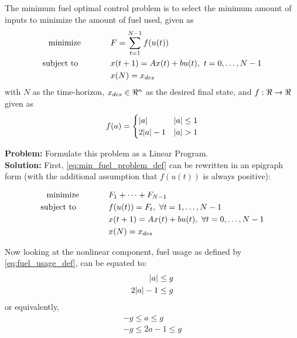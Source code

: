 \documentclass[letter]{article}
\newcommand{\optpblm}[3][eq:default]{
	\begin{equation}\label{#1}
		\begin{aligned}
			\text{minimize} \hspace{0.5in} &#2\vspace{5pt}\\
			\text{subject to \hspace{0.5in}} &#3
		\end{aligned}	
	\end{equation}
}
\begin{document}
The minimum fuel optimal control problem is to select the minimum amount of inputs to minimize the amount of fuel used, given as
\begin{equation}\label{eq:min_fuel_problem_def}
	\begin{aligned}
		\text{minimize} \hspace{0.5in} &F = \sum_{t=1}^{N-1} f(u(t))\\
		\text{subject to \hspace{0.5in}} & x(t+1) = A x(t) + b u(t), \ t = 0,\dots,N-1\\
		& x(N) = x_{des}
	\end{aligned}	
\end{equation}
with $N$ as the time-horizon, $x_{des} \in \real^n$ as the desired final state, and $f: \real \to \real$ given as
\begin{equation}\label{eq:fuel_usage_def}
	f(a) = 
	\begin{cases}
		\abs{a} & \abs{a} \leq 1 \\
		2 \abs{a} - 1 & \abs{a} > 1
	\end{cases}
\end{equation}

\textbf{Problem:}
Formulate this problem as a Linear Program.\\

\textbf{Solution:}
First, \ref{eq:min_fuel_problem_def} can be rewritten in an epigraph form (with the additional assumption that $f(u(t))$ is always positive):
\optpblm[eq:min_fuel_problem_epigraph]{F_1 + \cdots + F_{N-1}}{
		f(u(t)) = F_t, \ \forall t = 1, \dots, N-1\\
		& x(t+1) = A x(t) + b u(t), \ \forall t = 0,\dots,N-1\\
		&x(N) = x_{des}}
Now looking at the nonlinear component, fuel usage as defined by \eqref{eq:fuel_usage_def}, can be equated to:
\begin{equation}
	\begin{aligned}
		\abs{a} \leq g\\
		2 \abs{a} - 1 \leq g\\
	\end{aligned}
\end{equation}
or equivalently,
\begin{equation}
	\begin{aligned}
		-g \leq a \leq g\\
		-g \leq 2a -1 \leq g
	\end{aligned}
\end{equation}
\end{document}
